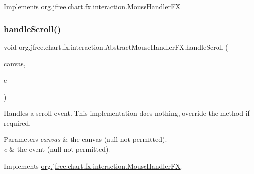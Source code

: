 Implements \mbox{\hyperlink{interfaceorg_1_1jfree_1_1chart_1_1fx_1_1interaction_1_1_mouse_handler_f_x_adbb7fa38b9913c536fb2a3ae09c70058}{org.\+jfree.\+chart.\+fx.\+interaction.\+Mouse\+Handler\+FX}}.

\mbox{\label{classorg_1_1jfree_1_1chart_1_1fx_1_1interaction_1_1_abstract_mouse_handler_f_x_a1295d12f1bd621599427b782237b9e0c}} 
\subsubsection{\texorpdfstring{handle\+Scroll()}{handleScroll()}}
{\footnotesize\ttfamily void org.\+jfree.\+chart.\+fx.\+interaction.\+Abstract\+Mouse\+Handler\+F\+X.\+handle\+Scroll (\begin{DoxyParamCaption}\item[{\mbox{\hyperlink{classorg_1_1jfree_1_1chart_1_1fx_1_1_chart_canvas}{Chart\+Canvas}}}]{canvas,  }\item[{Scroll\+Event}]{e }\end{DoxyParamCaption})}

Handles a scroll event. This implementation does nothing, override the method if required.


\begin{DoxyParams}{Parameters}
{\em canvas} & the canvas ({\ttfamily null} not permitted). \\
\hline
{\em e} & the event ({\ttfamily null} not permitted). \\
\hline
\end{DoxyParams}


Implements \mbox{\hyperlink{interfaceorg_1_1jfree_1_1chart_1_1fx_1_1interaction_1_1_mouse_handler_f_x_a271047b9229d2fbebbfefe173f153b2e}{org.\+jfree.\+chart.\+fx.\+interaction.\+Mouse\+Handler\+FX}}.

\mbox{\label{classorg_1_1jfree_1_1chart_1_1fx_1_1interaction_1_1_abstract_mouse_handler_f_x_a9fe0aad14036619a388d6894d19c3f0a}} 
